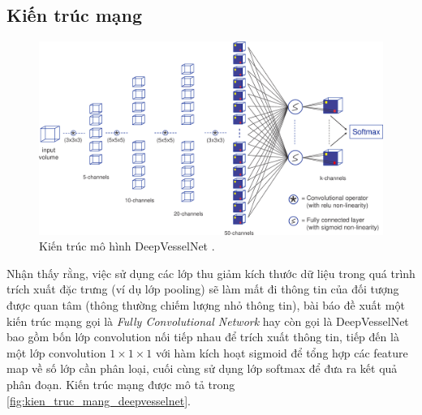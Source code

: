 \subsection{Kiến trúc mạng}
\label{subsec:kien_truc_mang_deepvesselnet}
	\begin{figure}[h!]
		\includegraphics[width=\textwidth]{figures/model_dvn}
		\caption[Kiến trúc mô hình DeepVesselNet.]{Kiến trúc mô hình DeepVesselNet .}
		\label{fig:kien_truc_mang_deepvesselnet}
	\end{figure}
	Nhận thấy rằng, việc sử dụng các lớp thu giảm kích thước dữ liệu trong quá trình trích xuất đặc trưng (ví dụ lớp pooling) sẽ làm mất đi thông tin của đối tượng được quan tâm (thông thường chiếm lượng nhỏ thông tin), bài báo đề xuất một kiến trúc mạng gọi là \textit{Fully Convolutional Network} hay còn gọi là DeepVesselNet bao gồm bốn lớp convolution nối tiếp nhau để trích xuất thông tin, tiếp đến là một lớp convolution $1\times1\times1$ với hàm kích hoạt sigmoid để tổng hợp các feature map về số lớp cần phân loại, cuối cùng sử dụng lớp softmax để đưa ra kết quả phân đoạn. Kiến trúc mạng được mô tả trong \autoref{fig:kien_truc_mang_deepvesselnet}.
	
